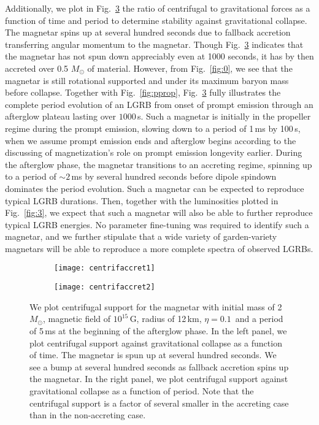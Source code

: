 \documentclass{article}
\begin{document}
Additionally, we plot in Fig.~\ref{fig:6} the ratio of centrifugal to gravitational forces as a function of time and period to determine stability against gravitational collapse. The magnetar spins up at several hundred seconds due to fallback accretion transferring angular momentum to the magnetar. Though Fig.~\ref{fig:6} indicates that the magnetar has not spun down appreciably even at 1000 seconds, it has by then accreted over 0.5 $M_{\odot}$ of material. However, from Fig.~\ref{fig:0}, we see that the magnetar is still rotational supported and under its maximum baryon mass before collapse. Together with Fig.~\ref{fig:pprop}, Fig.~\ref{fig:6} fully illustrates the complete period evolution of an LGRB from onset of prompt emission through an afterglow plateau lasting over $1000$\,s. Such a magnetar is initially in the propeller regime during the prompt emission, slowing down to a period of 1\,ms by 100\,s, when we assume prompt emission ends and afterglow begins according to the discussing of magnetization's role on prompt emission longevity earlier. During the afterglow phase, the magnetar transitions to an accreting regime, spinning up to a period of $\sim 2$\,ms by several hundred seconds before dipole spindown dominates the period evolution. Such a magnetar can be expected to reproduce typical LGRB durations. Then, together with the luminosities plotted in Fig.~\ref{fig:3}, we expect that such a magnetar will also be able to further reproduce typical LGRB energies. No parameter fine-tuning was required to identify such a magnetar, and we further stipulate that a wide variety of garden-variety magnetars will be able to reproduce a more complete spectra of observed LGRBs.

\begin{figure}[h!]
\centering
\begin{subfigure}{.5\textwidth}
    \centering
    \texttt{[image: centrifaccret1]}
    \caption{}
    \label{fig:6a}
\end{subfigure}%
\begin{subfigure}{.5\textwidth}
    \centering
    \texttt{[image: centrifaccret2]}
    \caption{}
    \label{fig:6b}
\end{subfigure}
\caption{We plot centrifugal support for the magnetar with initial mass of 2 $M_{\odot}$, magnetic field of $10^{15}$\,G, radius of 12\,km, $\eta=0.1$\, and a period of 5\,ms at the beginning of the afterglow phase. In the left panel, we plot centrifugal support against gravitational collapse as a function of time. The magnetar is spun up at several hundred seconds. We see a bump at several hundred seconds as fallback accretion spins up the magnetar. In the right panel, we plot centrifugal support against gravitational collapse as a function of period. Note that the centrifugal support is a factor of several smaller in the accreting case than in the non-accreting case.}
\label{fig:6}
\end{figure}
\end{document}
